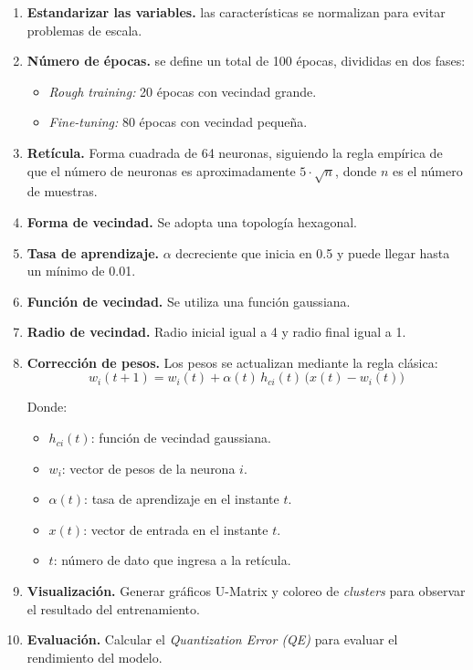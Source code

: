 \documentclass[12pt,a4paper]{article}
\begin{document}
\begin{enumerate}
  \item \textbf{Estandarizar las variables.} las características se normalizan para evitar problemas de escala.
  \item \textbf{Número de épocas.} se define un total de 100 épocas, divididas en dos fases:
  \begin{itemize}
    \item \textit{Rough training:} 20 épocas con vecindad grande.
    \item \textit{Fine-tuning:} 80 épocas con vecindad pequeña.
  \end{itemize}
  \item \textbf{Retícula.} Forma cuadrada de 64 neuronas, siguiendo la regla empírica de que el número de neuronas es 
  aproximadamente $5 \cdot \sqrt{n}$, donde $n$ es el número de muestras.
  \item \textbf{Forma de vecindad.} Se adopta una topología hexagonal.
  \item \textbf{Tasa de aprendizaje.} $\alpha$ decreciente que inicia en 0.5 y puede llegar hasta un mínimo de 0.01.
  \item \textbf{Función de vecindad.} Se utiliza una función gaussiana.
  \item \textbf{Radio de vecindad.} Radio inicial igual a 4 y radio final igual a 1.
  \item \textbf{Corrección de pesos.} Los pesos se actualizan mediante la regla clásica:
  \begin{equation}
    w_i(t+1) = w_i(t) + \alpha(t) \, h_{ci}(t) \, \big( x(t) - w_i(t) \big)
  \end{equation}

  Donde:
  \begin{itemize}
    \item $h_{ci}(t)$: función de vecindad gaussiana.
    \item $w_i$: vector de pesos de la neurona $i$.
    \item $\alpha(t)$: tasa de aprendizaje en el instante $t$.
    \item $x(t)$: vector de entrada en el instante $t$.
    \item $t$: número de dato que ingresa a la retícula.
  \end{itemize}

  \item \textbf{Visualización.} Generar gráficos U-Matrix y coloreo de \textit{clusters} para observar el resultado del entrenamiento.
  \item \textbf{Evaluación.} Calcular el \textit{Quantization Error (QE)} para evaluar el rendimiento del modelo.
\end{enumerate}
\end{document}
